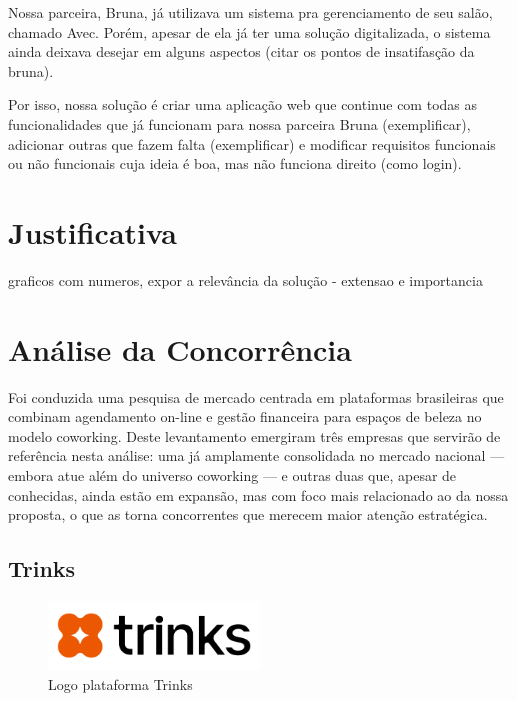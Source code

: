 Nossa parceira, Bruna, já utilizava um sistema pra gerenciamento de seu salão, chamado Avec. Porém, apesar de ela já ter uma solução digitalizada, o sistema ainda deixava desejar em alguns aspectos (citar os pontos de insatifasção da bruna). 

Por isso, nossa solução é criar uma aplicação web que continue com todas as funcionalidades que já funcionam para nossa parceira Bruna (exemplificar), adicionar outras que fazem falta (exemplificar) e modificar requisitos funcionais ou não funcionais cuja ideia é boa, mas não funciona direito (como login).
\section{Justificativa}
graficos com numeros, expor a relevância da solução - extensao e importancia
\section{Análise da Concorrência}

Foi conduzida uma pesquisa de mercado centrada em plataformas brasileiras que combinam agendamento on-line e gestão financeira para espaços de beleza no modelo coworking. Deste levantamento emergiram três empresas que servirão de referência nesta análise: uma já amplamente consolidada no mercado nacional — embora atue além do universo coworking — e outras duas que, apesar de conhecidas, ainda estão em expansão, mas com foco mais relacionado ao da nossa proposta, o que as torna concorrentes que merecem maior atenção estratégica.

\subsection{Trinks}

\begin{figure}[htb]
	\centering
	\includegraphics[width=0.5\textwidth]{cap01-Introducao/Images/1.4.1_Trinks}
	\caption{Logo plataforma Trinks}
	\label{fig:Trinks}
\end{figure}

